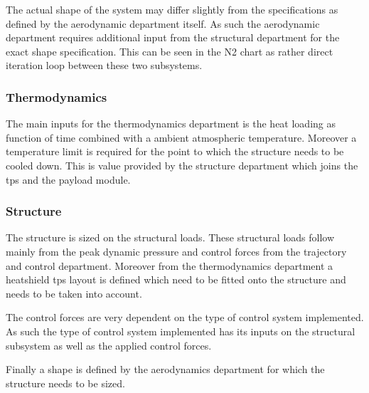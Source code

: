 The actual shape of the system may differ slightly from the specifications as defined by the aerodynamic department itself. As such the aerodynamic department requires additional input from the structural department for the exact shape specification. This can be seen in the N2 chart as rather direct iteration loop between these two subsystems.

\subsubsection{Thermodynamics}
The main inputs for the thermodynamics department is the heat loading as function of time combined with a ambient atmospheric temperature. Moreover a temperature limit is required for the point to which the structure needs to be cooled down. This is value provided by the structure department which joins the \gls{tps} and the payload module.

\subsubsection{Structure}

The structure is sized on the structural loads. These structural loads follow mainly from the peak dynamic pressure and control forces from the trajectory and control department. Moreover from the thermodynamics department a heatshield \gls{tps} layout is defined which need to be fitted onto the structure and needs to be taken into account. 

The control forces are very dependent on the type of control system implemented. As such the type of control system implemented has its inputs on the structural subsystem as well as the applied control forces. 

Finally a shape is defined by the aerodynamics department for which the structure needs to be sized. 



